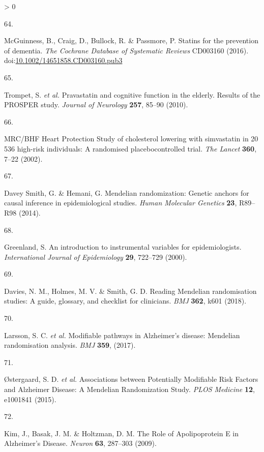 \documentclass[a4paper, twoside]{templates/ociamthesis}
\newlength{\cslhangindent}
\newlength{\csllabelwidth}
\newenvironment{CSLReferences}[3] %
 {%
  \setlength{\parindent}{0pt}
  \ifodd #1 \everypar{\setlength{\hangindent}{\cslhangindent}}\ignorespaces\fi
  \ifnum #2 > 0
  \setlength{\parskip}{#2\baselineskip}
  \fi
 }%
 {}
\newcommand{\CSLLeftMargin}[1]{\parbox[t]{\maxof{\widthof{#1}}{\csllabelwidth}}{#1}}
\newcommand{\CSLRightInline}[1]{\parbox[t]{\linewidth - \csllabelwidth}{#1}}
\begin{document}
\begin{CSLReferences}{0}{0}
\leavevmode\hypertarget{ref-mcguinness2016}{}%
\CSLLeftMargin{64. }
\CSLRightInline{McGuinness, B., Craig, D., Bullock, R. \& Passmore, P. Statins for the prevention of dementia. \emph{The Cochrane Database of Systematic Reviews} CD003160 (2016). doi:\href{https://doi.org/10.1002/14651858.CD003160.pub3}{10.1002/14651858.CD003160.pub3}}

\leavevmode\hypertarget{ref-trompet2010}{}%
\CSLLeftMargin{65. }
\CSLRightInline{Trompet, S. \emph{et al.} Pravastatin and cognitive function in the elderly. {Results} of the {PROSPER} study. \emph{Journal of Neurology} \textbf{257}, 85--90 (2010).}

\leavevmode\hypertarget{ref-heartprotectionstudycollaborativegroup2002}{}%
\CSLLeftMargin{66. }
\CSLRightInline{{MRC}/{BHF Heart Protection Study} of cholesterol lowering with simvastatin in 20 536 high-risk individuals: A randomised placebocontrolled trial. \emph{The Lancet} \textbf{360}, 7--22 (2002).}

\leavevmode\hypertarget{ref-daveysmith2014}{}%
\CSLLeftMargin{67. }
\CSLRightInline{Davey Smith, G. \& Hemani, G. Mendelian randomization: Genetic anchors for causal inference in epidemiological studies. \emph{Human Molecular Genetics} \textbf{23}, R89--R98 (2014).}

\leavevmode\hypertarget{ref-greenland2000}{}%
\CSLLeftMargin{68. }
\CSLRightInline{Greenland, S. An introduction to instrumental variables for epidemiologists. \emph{International Journal of Epidemiology} \textbf{29}, 722--729 (2000).}

\leavevmode\hypertarget{ref-davies2018}{}%
\CSLLeftMargin{69. }
\CSLRightInline{Davies, N. M., Holmes, M. V. \& Smith, G. D. Reading {Mendelian} randomisation studies: A guide, glossary, and checklist for clinicians. \emph{BMJ} \textbf{362}, k601 (2018).}

\leavevmode\hypertarget{ref-larsson2017}{}%
\CSLLeftMargin{70. }
\CSLRightInline{Larsson, S. C. \emph{et al.} Modifiable pathways in {Alzheimer}'s disease: Mendelian randomisation analysis. \emph{BMJ} \textbf{359}, (2017).}

\leavevmode\hypertarget{ref-ostergaard2015}{}%
\CSLLeftMargin{71. }
\CSLRightInline{Østergaard, S. D. \emph{et al.} Associations between {Potentially Modifiable Risk Factors} and {Alzheimer Disease}: A {Mendelian Randomization Study}. \emph{PLOS Medicine} \textbf{12}, e1001841 (2015).}

\leavevmode\hypertarget{ref-kim2009}{}%
\CSLLeftMargin{72. }
\CSLRightInline{Kim, J., Basak, J. M. \& Holtzman, D. M. The {Role} of {Apolipoprotein E} in {Alzheimer}'s {Disease}. \emph{Neuron} \textbf{63}, 287--303 (2009).}


\end{CSLReferences}
\end{document}
